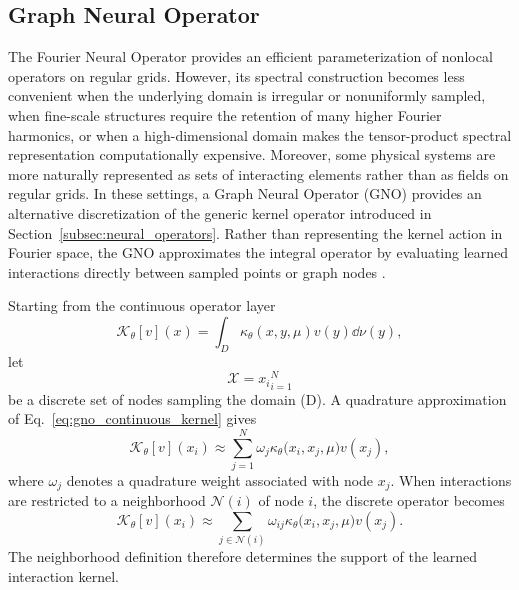\subsection{Graph Neural Operator}
\label{subsec:graph_neural_operator}

The Fourier Neural Operator provides an efficient parameterization of nonlocal operators on regular grids. However, its spectral construction becomes less convenient when the underlying domain is irregular or nonuniformly sampled, when fine-scale structures require the retention of many higher Fourier harmonics, or when a high-dimensional domain makes the tensor-product spectral representation computationally expensive. Moreover, some physical systems are more naturally represented as sets of interacting elements rather than as fields on regular grids. In these settings, a Graph Neural Operator (GNO) provides an alternative discretization of the generic kernel operator introduced in Section~\ref{subsec:neural_operators}. Rather than representing the kernel action in Fourier space, the GNO approximates the integral operator by evaluating learned interactions directly between sampled points or graph nodes \cite{li_graph_kernel_2020,kovachki_neural_2023}.

Starting from the continuous operator layer
\begin{equation}
\mathcal{K}_{\theta}[v](x)
=
\int_D
\kappa_{\theta}(x,y,\mu)
v(y)
\dd\nu(y),
\label{eq:gno_continuous_kernel}
\end{equation}
let
\begin{equation}
\mathcal{X}
=
{x_i}_{i=1}^{N}
\end{equation}
be a discrete set of nodes sampling the domain (D). A quadrature approximation of Eq.~\eqref{eq:gno_continuous_kernel} gives
\begin{equation}
\mathcal{K}_{\theta}[v](x_i)
\approx
\sum_{j=1}^{N}
\omega_j
\kappa_{\theta}
\bigl(
x_i,
x_j,
\mu
\bigr)
v(x_j),
\label{eq:gno_quadrature}
\end{equation}
where $\omega_j$ denotes a quadrature weight associated with node $x_j$. When interactions are restricted to a neighborhood
$\mathcal{N}(i)$ of node $i$,
the discrete operator becomes
\begin{equation}
\mathcal{K}_{\theta}[v](x_i)
\approx
\sum_{j\in\mathcal{N}(i)}
\omega_{ij}
\kappa_{\theta}
\bigl(
x_i,
x_j,
\mu
\bigr)
v(x_j).
\label{eq:gno_local_quadrature}
\end{equation}
The neighborhood definition therefore determines the support of the learned interaction kernel.

